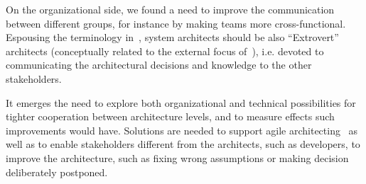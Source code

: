 On the organizational side, we found a need to improve the communication between
different groups, for instance by making teams more cross-functional. 
Espousing the terminology
in~\cite{IEEESoftwarePatrizio}, system architects should be also
``Extrovert'' architects (conceptually related to the external focus
of~\cite{Kruchten2008}), i.e. devoted to communicating the architectural
decisions and knowledge to the other stakeholders. 


It emerges the need to explore both organizational and technical
possibilities for tighter cooperation between architecture levels, and to
measure effects such improvements would have. 
Solutions are needed to support agile architecting~\cite{shahrokni2016organic} %
as well as to enable stakeholders different from the architects, such as developers, to improve the architecture, such as fixing wrong assumptions or making decision deliberately postponed.

